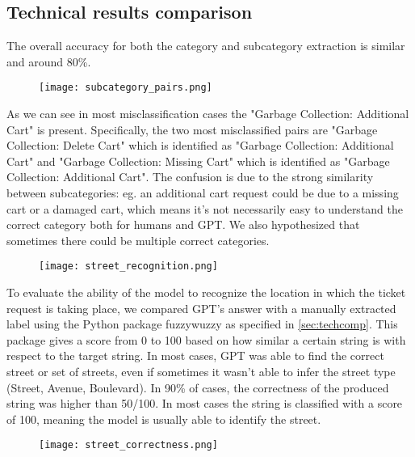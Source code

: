 \subsection{Technical results comparison}
The overall accuracy for both the category and subcategory extraction is similar and around 80\%.
\begin{center}
      \begin{figure}[ht]
            \texttt{[image: subcategory\_pairs.png]}
      \end{figure}
\end{center}
As we can see in most misclassification cases the "Garbage Collection: Additional Cart" is present. Specifically, the two most misclassified pairs are "Garbage Collection: Delete Cart" which is identified as "Garbage Collection: Additional Cart" and "Garbage Collection: Missing Cart" which is identified as "Garbage Collection: Additional Cart". The confusion is due to the strong similarity between subcategories: eg. an additional cart request could be due to a missing cart or a damaged cart, which means it's not necessarily easy to understand the correct category both for humans and GPT. We also hypothesized that sometimes there could be multiple correct categories.
\begin{center}
      \begin{figure}[ht]
            \texttt{[image: street\_recognition.png]}
      \end{figure}
\end{center}
To evaluate the ability of the model to recognize the location in which the ticket request is taking place, we compared GPT's answer with a manually extracted label using the Python package fuzzywuzzy as specified in \ref{sec:techcomp}. This package gives a score from 0 to 100 based on how similar a certain string is with respect to the target string.
In most cases, GPT was able to find the correct street or set of streets, even if sometimes it wasn't able to infer the street type (Street, Avenue, Boulevard). In 90\% of cases, the correctness of the produced string was higher than 50/100. In most cases the string is classified with a score of 100, meaning the model is usually able to identify the street.
\begin{center}
      \begin{figure}[ht]
            \texttt{[image: street\_correctness.png]}
      \end{figure}
\end{center}


